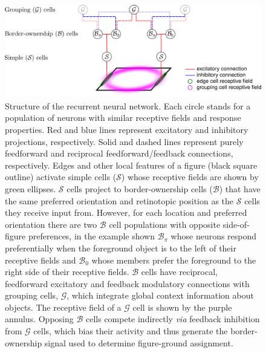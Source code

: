 \begin{figure}[t!]
\centering
\includegraphics[width=\textwidth]{NaturalImage/figs/model_circuit.png}
\makeatletter
\let\@currsize\normalsize
\caption[Structure of the recurrent neural network model for figure-ground organization of natural images]{Structure of the recurrent neural network. Each circle stands for a
  population of neurons with similar receptive fields and response
  properties.  Red and blue lines represent excitatory and inhibitory projections,
  respectively. Solid and dashed lines represent purely feedforward and reciprocal feedforward/feedback connections, respectively. Edges and other local features of a figure (black square outline) activate simple cells ($\mathcal{S}$) whose receptive
  fields are shown by green ellipses. $\mathcal{S}$ cells project to border-ownership cells ($\mathcal{B}$) that have the same preferred orientation and
  retinotopic position as the $\mathcal{S}$ cells they receive input
  from. However, for each location and preferred orientation there are
  two $\mathcal{B}$ cell populations with opposite side-of-figure preferences, in
  the example shown $\mathcal{B}_{\pi}$ whose neurons respond preferentially when
  the foreground object is to the left of their receptive fields and
  $\mathcal{B}_{0}$ whose members prefer the foreground to the right side of
  their receptive fields. $\mathcal{B}$ cells have reciprocal, feedforward
  excitatory and feedback modulatory connections with grouping cells, $\mathcal{G}$, which integrate global context information about objects. The receptive field of a $\mathcal{G}$ cell is shown by the purple annulus. Opposing $\mathcal{B}$ cells compete indirectly {\em via}
  feedback inhibition
  from $\mathcal{G}$ cells, which bias their activity and thus generate the border-ownership signal used to determine figure-ground assignment.}
\label{Fig:model}
\end{figure}

